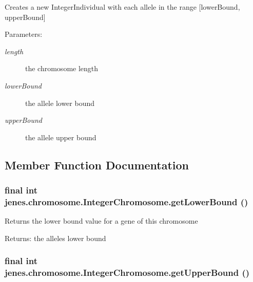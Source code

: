 Creates a new IntegerIndividual with each allele in the range \mbox{[}lowerBound, upperBound\mbox{]} 

\begin{Desc}
\item[Parameters:]
\begin{description}
\item[{\em length}]the chromosome length \item[{\em lowerBound}]the allele lower bound \item[{\em upperBound}]the allele upper bound \end{description}
\end{Desc}


\subsection{Member Function Documentation}
\hypertarget{classjenes_1_1chromosome_1_1_integer_chromosome_e3932d5f359d42a6fb783f9254e870b7}{
\subsubsection[getLowerBound]{\setlength{\rightskip}{0pt plus 5cm}final int jenes.chromosome.IntegerChromosome.getLowerBound ()}}
\label{classjenes_1_1chromosome_1_1_integer_chromosome_e3932d5f359d42a6fb783f9254e870b7}


Returns the lower bound value for a gene of this chromosome

\begin{Desc}
\item[Returns:]the alleles lower bound \end{Desc}
\hypertarget{classjenes_1_1chromosome_1_1_integer_chromosome_f5a9d680853b67fd2ad8fc96853957d5}{
\subsubsection[getUpperBound]{\setlength{\rightskip}{0pt plus 5cm}final int jenes.chromosome.IntegerChromosome.getUpperBound ()}}
\label{classjenes_1_1chromosome_1_1_integer_chromosome_f5a9d680853b67fd2ad8fc96853957d5}


